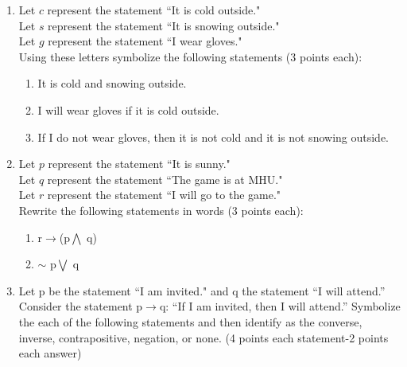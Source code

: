 \documentclass[12pt]{article}
\begin{document}
\begin{enumerate}
\item
Let $c$ represent the statement ``It is cold outside."
\\Let $s$ represent the statement ``It is snowing outside."
\\Let $g$ represent the statement ``I wear gloves."
\\Using these letters symbolize the following statements (3 points each):
\begin{enumerate}
\item It is cold and snowing outside.
\vspace{.7 in}
\item I will wear gloves if it is cold outside.
\vspace{.7 in}
\item If I do not wear gloves, then it is not cold and it is not snowing outside.
\vspace{.7 in}

\end{enumerate}

\item
Let $p$ represent the statement ``It is sunny."
\\Let $q$ represent the statement ``The game is at MHU."
\\Let $r$ represent the statement ``I will go to the game."
\\Rewrite the following statements in words (3 points each):
\begin{enumerate}
\item r$\rightarrow$(p$\bigwedge$ q)
\vspace{1.5 in}
\item $\sim$ p$\bigvee$ q
\vspace{1.5 in}

\end{enumerate}

\item Let p be the statement ``I am invited." and q the statement ``I will attend.''  Consider the statement p$\rightarrow$q: ``If I am invited, then I will attend.''  Symbolize the each of the following statements and then identify as the converse, inverse, contrapositive, negation, or none. (4 points each statement-2 points each answer)


\end{enumerate}
\end{document}
